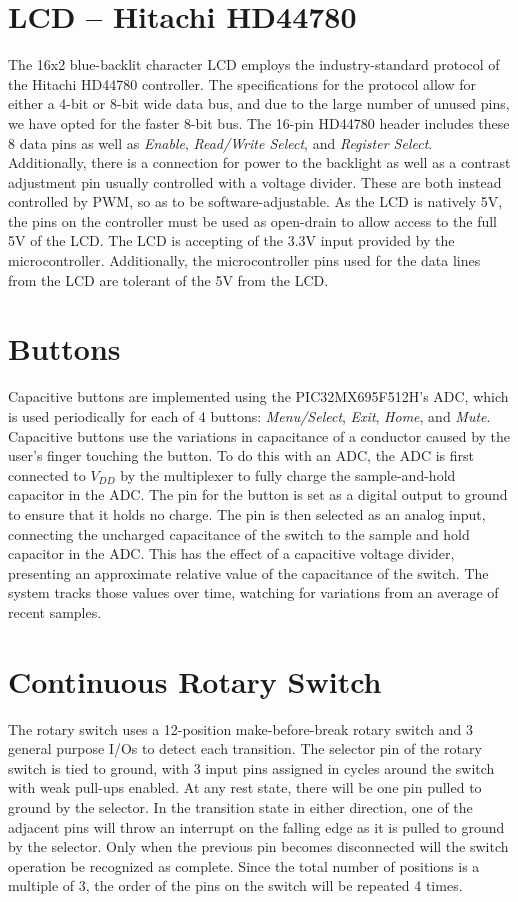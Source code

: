 \section{LCD -- Hitachi HD44780}
\label{sec:lcd}
The 16x2 blue-backlit character LCD employs the industry-standard protocol of the Hitachi HD44780 controller. The specifications for the protocol allow for either a 4-bit or 8-bit wide data bus, and due to the large number of unused pins, we have opted for the faster 8-bit bus. The 16-pin HD44780 header includes these 8 data pins as well as \emph{Enable}, \emph{Read/Write Select}, and \emph{Register Select}. Additionally, there is a connection for power to the backlight as well as a contrast adjustment pin usually controlled with a voltage divider. These are both instead controlled by PWM, so as to be software-adjustable. As the LCD is natively 5V, the pins on the controller must be used as open-drain to allow access to the full 5V of the LCD. The LCD is accepting of the 3.3V input provided by the microcontroller. Additionally, the microcontroller pins used for the data lines from the LCD are tolerant of the 5V from the LCD.

\section{Buttons}
\label{sec:buttons}
Capacitive buttons are implemented using the PIC32MX695F512H's ADC, which is used periodically for each of 4 buttons: \emph{Menu/Select}, \emph{Exit}, \emph{Home}, and \emph{Mute}. Capacitive buttons use the variations in capacitance of a conductor caused by the user's finger touching the button. To do this with an ADC, the ADC is first connected to $V_{DD}$ by the multiplexer to fully charge the sample-and-hold capacitor in the ADC. The pin for the button is set as a digital output to ground to ensure that it holds no charge. The pin is then selected as an analog input, connecting the uncharged capacitance of the switch to the sample and hold capacitor in the ADC. This has the effect of a capacitive voltage divider, presenting an approximate relative value of the capacitance of the switch. The system tracks those values over time, watching for variations from an average of recent samples. 

\section{Continuous Rotary Switch}
\label{sec:rotary}
The rotary switch uses a 12-position make-before-break rotary switch and 3 general purpose I/Os to detect each transition. The selector pin of the rotary switch is tied to ground, with 3 input pins assigned in cycles around the switch with weak pull-ups enabled. At any rest state, there will be one pin pulled to ground by the selector. In the transition state in either direction, one of the adjacent pins will throw an interrupt on the falling edge as it is pulled to ground by the selector. Only when the previous pin becomes disconnected will the switch operation be recognized as complete. Since the total number of positions is a multiple of 3, the order of the pins on the switch will be repeated 4 times.

